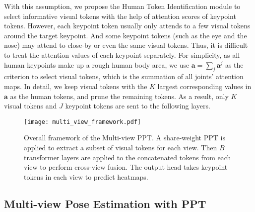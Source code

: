 \documentclass[runningheads]{llncs}
\begin{document}
With this assumption, we propose the Human Token Identification module to select informative visual tokens with the help of attention scores of keypoint tokens. 
However, each keypoint token usually only attends to a few visual tokens around the target keypoint. And some keypoint tokens (such as the eye and the nose) may attend to close-by or even the same visual tokens. Thus, it is difficult to treat the attention values of each keypoint separately. 
For simplicity, as all human keypoints make up a rough human body area, we use $\mathbf{a} = \sum_j \mathbf{a}^j$ as the criterion to select visual tokens, which is the summation of all joints' attention maps. 
In detail, we keep visual tokens with the $K$ largest corresponding values in $\mathbf{a}$ as the human tokens, and prune the remaining tokens. As a result, only $K$ visual tokens and $J$ keypoint tokens are sent to the following layers. 

















\begin{figure}[t!]
    \centering
    \texttt{[image: multi\_view\_framework.pdf]}
    \caption{ \small{Overall framework of the Multi-view PPT. A share-weight PPT is applied to extract a subset of visual tokens for each view. Then $B$ transformer layers are applied to the concatenated tokens from each view to perform cross-view fusion. The output head takes keypoint tokens in each view to predict heatmaps.} }
    \label{fig:multi_view_framework}
\end{figure}



\vspace{-0.5em}
\subsection{Multi-view Pose Estimation with PPT}
\label{sec:PPT_multiview}
\end{document}

